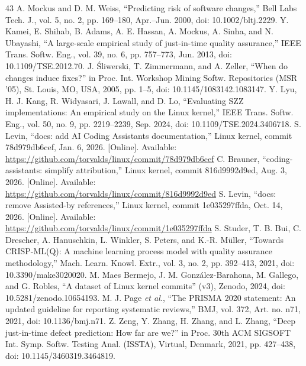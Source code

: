 \begin{thebibliography}{43}
 A. Mockus and D. M. Weiss, ``Predicting risk of software changes,'' Bell Labs Tech. J., vol. 5, no. 2, pp. 169--180, Apr.--Jun. 2000, doi: \mbox{10.1002/bltj.2229}.
 Y. Kamei, E. Shihab, B. Adams, A. E. Hassan, A. Mockus, A. Sinha, and N. Ubayashi, ``A large-scale empirical study of just-in-time quality assurance,'' IEEE Trans. Softw. Eng., vol. 39, no. 6, pp. 757--773, Jun. 2013, doi: \mbox{10.1109/TSE.2012.70}.
 J. Śliwerski, T. Zimmermann, and A. Zeller, ``When do changes induce fixes?'' in Proc. Int. Workshop Mining Softw. Repositories (MSR '05), St. Louis, MO, USA, 2005, pp. 1--5, doi: \mbox{10.1145/1083142.1083147}.
 Y. Lyu, H. J. Kang, R. Widyasari, J. Lawall, and D. Lo, ``Evaluating SZZ implementations: An empirical study on the Linux kernel,'' IEEE Trans. Softw. Eng., vol. 50, no. 9, pp. 2219--2239, Sep. 2024, doi: \mbox{10.1109/TSE.2024.3406718}.
 S. Levin, ``docs: add AI Coding Assistants documentation,'' Linux kernel, commit 78d979db6cef, Jan. 6, 2026. [Online]. Available: \url{https://github.com/torvalds/linux/commit/78d979db6cef}
 C. Brauner, ``coding-assistants: simplify attribution,'' Linux kernel, commit 816d9992d9ed, Aug. 3, 2026. [Online]. Available: \url{https://github.com/torvalds/linux/commit/816d9992d9ed}
 S. Levin, ``docs: remove Assisted-by references,'' Linux kernel, commit 1e035297ffda, Oct. 14, 2026. [Online]. Available: \url{https://github.com/torvalds/linux/commit/1e035297ffda}
 S. Studer, T. B. Bui, C. Drescher, A. Hanuschkin, L. Winkler, S. Peters, and K.-R. M\"uller, ``Towards CRISP-ML(Q): A machine learning process model with quality assurance methodology,'' Mach. Learn. Knowl. Extr., vol. 3, no. 2, pp. 392--413, 2021, doi: 10.3390/make3020020.
 M. Maes Bermejo, J. M. González-Barahona, M. Gallego, and G. Robles, ``A dataset of Linux kernel commits'' (v3), Zenodo, 2024, doi: 10.5281/zenodo.10654193.
 M. J. Page \emph{et al.}, ``The PRISMA 2020 statement: An updated guideline for reporting systematic reviews,'' BMJ, vol. 372, Art. no. n71, 2021, doi: 10.1136/bmj.n71.
 Z. Zeng, Y. Zhang, H. Zhang, and L. Zhang, ``Deep just-in-time defect prediction: How far are we?'' in Proc. 30th ACM SIGSOFT Int. Symp. Softw. Testing Anal. (ISSTA), Virtual, Denmark, 2021, pp. 427--438, doi: \mbox{10.1145/3460319.3464819}.

\end{thebibliography}
